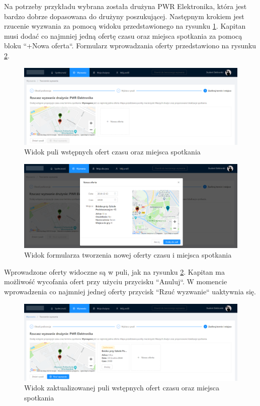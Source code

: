 Na potrzeby przykładu wybrana została drużyna PWR Elektronika, która jest bardzo dobrze dopasowana do drużyny poszukującej. Następnym krokiem jest rzucenie wyzwania za pomocą widoku przedstawionego na rysunku \ref{fig:ss-search-5}. Kapitan musi dodać co najmniej jedną ofertę czasu oraz miejsca spotkania za pomocą bloku ``+Nowa oferta``. Formularz wprowadzania oferty przedstawiono na rysunku \ref{fig:ss-search-6}.

\begin{figure}[H]
\centering
\includegraphics[width=\linewidth]{065-dzialanie/rys/ss-search-5.PNG}
\caption{Widok puli wstępnych ofert czasu oraz miejsca spotkania}
\label{fig:ss-search-5}
\end{figure}


\begin{figure}[H]
\centering
\includegraphics[width=\linewidth]{065-dzialanie/rys/ss-search-6.PNG}
\caption{Widok formularza tworzenia nowej oferty czasu i miejsca spotkania}
\label{fig:ss-search-6}
\end{figure}

Wprowadzone oferty widoczne są w puli, jak na rysunku \ref{fig:ss-search-6}. Kapitan ma możliwość wycofania ofert przy użyciu przycisku ``Anuluj``. W momencie wprowadzenia co najmniej jednej oferty przycisk ``Rzuć wyzwanie`` uaktywnia się.


\begin{figure}[H]
\centering
\includegraphics[width=\linewidth]{065-dzialanie/rys/ss-search-7.PNG}
\caption{Widok zaktualizowanej puli wstępnych ofert czasu oraz miejsca spotkania}
\label{fig:ss-search-7}
\end{figure}


